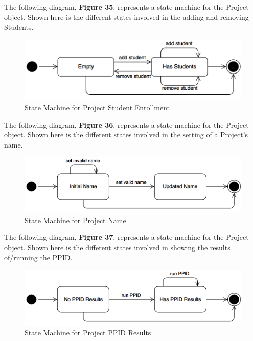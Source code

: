 \documentclass[12pt,letterpaper]{article}
\begin{document}
The following diagram, {\bf Figure 35}, represents a state machine for the Project object. Shown here is the different states involved in the adding and removing Students.

\begin{figure}[H]
	\centering{}
	\includegraphics[scale=0.3]{imgs/state/project-enrollment.png}
	\caption{State Machine for Project Student Enrollment}
\end{figure}

The following diagram, {\bf Figure 36}, represents a state machine for the Project object. Shown here is the different states involved in the setting of a Project's name.

\begin{figure}[H]
	\centering{}
	\includegraphics[scale=0.3]{imgs/state/project-name.png}
	\caption{State Machine for Project Name}
\end{figure}

The following diagram, {\bf Figure 37}, represents a state machine for the Project object. Shown here is the different states involved in showing the results of/running the PPID.

\begin{figure}[H]
	\centering{}
	\includegraphics[scale=0.3]{imgs/state/project-ppid-results.png}
	\caption{State Machine for Project PPID Results}
\end{figure}
\end{document}
